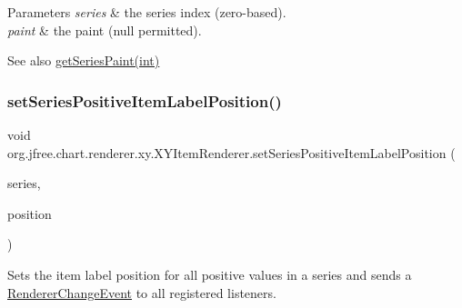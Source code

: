 \begin{DoxyParams}{Parameters}
{\em series} & the series index (zero-\/based). \\
\hline
{\em paint} & the paint ({\ttfamily null} permitted).\\
\hline
\end{DoxyParams}
\begin{DoxySeeAlso}{See also}
\mbox{\hyperlink{interfaceorg_1_1jfree_1_1chart_1_1renderer_1_1xy_1_1_x_y_item_renderer_a8931da4b274b83b939fc55f3f0b664a4}{get\+Series\+Paint(int)}} 
\end{DoxySeeAlso}
\mbox{\label{interfaceorg_1_1jfree_1_1chart_1_1renderer_1_1xy_1_1_x_y_item_renderer_a7a1e864e31d83a6f87499e6be32f66e7}} 
\subsubsection{\texorpdfstring{set\+Series\+Positive\+Item\+Label\+Position()}{setSeriesPositiveItemLabelPosition()}\hspace{0.1cm}{\footnotesize\ttfamily [1/2]}}
{\footnotesize\ttfamily void org.\+jfree.\+chart.\+renderer.\+xy.\+X\+Y\+Item\+Renderer.\+set\+Series\+Positive\+Item\+Label\+Position (\begin{DoxyParamCaption}\item[{int}]{series,  }\item[{\mbox{\hyperlink{classorg_1_1jfree_1_1chart_1_1labels_1_1_item_label_position}{Item\+Label\+Position}}}]{position }\end{DoxyParamCaption})}

Sets the item label position for all positive values in a series and sends a \mbox{\hyperlink{}{Renderer\+Change\+Event}} to all registered listeners.



